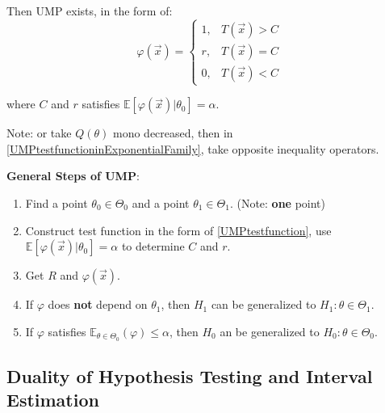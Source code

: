     Then UMP exists, in the form of:
    \begin{equation}\label{UMPtestfunctioninExponentialFamily}
            \varphi(\vec{x})=\begin{cases}
        1,&T(\vec{x})>C\\
        r,&T(\vec{x})=C\\
        0,&T(\vec{x})<C
    \end{cases} 
    \end{equation}
   
    

    where $C$ and $r$ satisfies $\mathbb{E}[\varphi(\vec{x})|\theta_0]=\alpha$.

    Note: or take $Q(\theta)$ mono decreased, then in \autoref{UMPtestfunctioninExponentialFamily}, take opposite inequality operators.
    
\begin{point}
    \textbf{General Steps of UMP}:
\end{point}

    
    \begin{enumerate}
        \item Find a point $\theta_0\in\Theta_0$ and a point $\theta_1\in\Theta_1$. (Note: \textbf{one} point)
        \item Construct test function in the form of {\autoref{UMPtestfunction}}, use $\mathbb{E}[\varphi(\vec{x})|\theta_0]=\alpha$ to determine $C$ and $r$.
        \item Get $R$ and $\varphi(\vec{x})$.
        \item If $\varphi$ does \textbf{not} depend on $\theta_1$, then $H_1$ can be generalized to $H_1:\theta\in\Theta_1$.
        \item If $\varphi$ satisfies $\mathbb{E}_{\theta\in\Theta_0}(\varphi)\leq\alpha$, then $H_0$ an be generalized to $H_0:\theta\in\Theta_0$.
    \end{enumerate}

\subsection{Duality of Hypothesis Testing and Interval Estimation}

